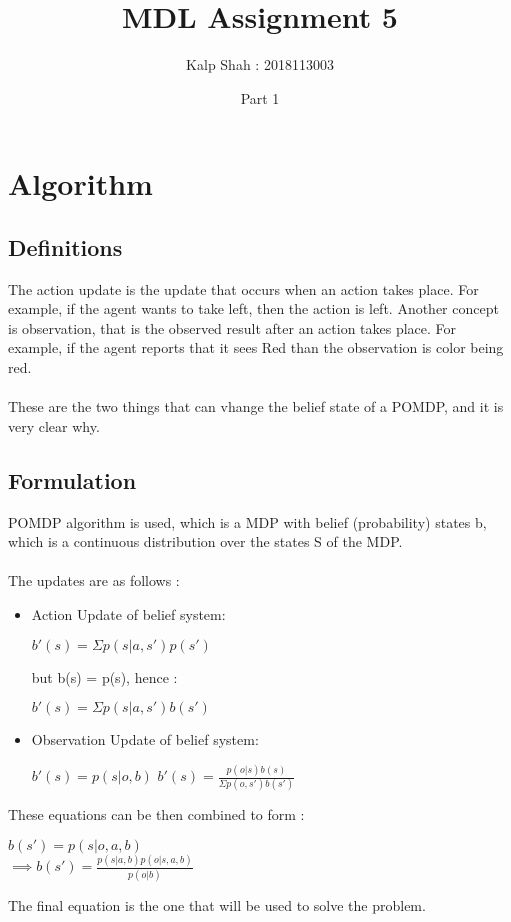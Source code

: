\documentclass[10pt,letterpaper]{article}
\title{MDL Assignment 5}
\date{Part 1}
\author{Kalp Shah : 2018113003}
\begin{document}
\maketitle
\section*{Algorithm}
\subsection*{Definitions}
The action update is the update that occurs when an 
action takes place. For example, if the agent wants to take left, then 
the action is left. Another concept is observation, that is the 
observed result after an action takes place. For example, if the 
agent reports that it sees Red than the observation is color being red.
\\\\
These are the two things that can vhange the belief state of a POMDP, 
and it is very clear why.
\subsection*{Formulation}
POMDP algorithm is used, which is a MDP with belief (probability) 
states b, which is a continuous distribution over the states S of 
the MDP.
\\\\
The updates are as follows :
\begin{itemize}
    \item Action Update of belief system:
    \begin{center}
        $b'(s) = \Sigma p(s|a,s')p(s')$
    \end{center}
    but b(s) = p(s), hence :
    \begin{center}
        $b'(s) = \Sigma p(s|a,s')b(s')$
    \end{center}

    \item Observation Update of belief system:
    \begin{center}
        $b'(s) = p(s|o,b)$
        $b'(s) = \frac{p(o|s)b(s)}{\Sigma p(o,s')b(s')}$
    \end{center}
\end{itemize} 
These equations can be then combined to form :
\begin{center}
    $b(s') = p(s|o,a,b)$\\
    $\implies b(s') = \frac{p(s|a,b)p(o|s,a,b)}{p(o|b)}$
\end{center}
The final equation is the one that will be used to solve the problem.
\end{document}
